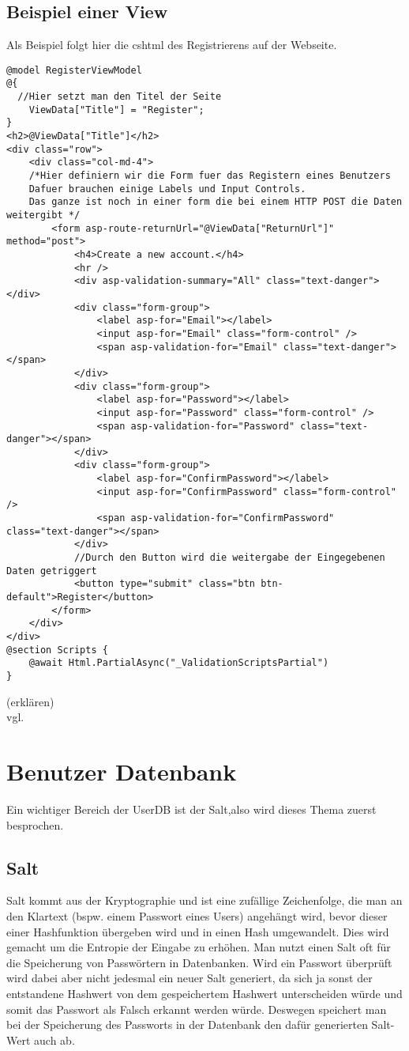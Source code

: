 {\subsection{Beispiel einer View}
\label{mvc_view_beispiel}
Als Beispiel folgt hier die cshtml des Registrierens auf der Webseite.
\begin{lstlisting}
@model RegisterViewModel
@{
  //Hier setzt man den Titel der Seite
    ViewData["Title"] = "Register";
}
<h2>@ViewData["Title"]</h2>
<div class="row">
    <div class="col-md-4">
    /*Hier definiern wir die Form fuer das Registern eines Benutzers
    Dafuer brauchen einige Labels und Input Controls. 
    Das ganze ist noch in einer form die bei einem HTTP POST die Daten weitergibt */
        <form asp-route-returnUrl="@ViewData["ReturnUrl"]" method="post">
            <h4>Create a new account.</h4>
            <hr />
            <div asp-validation-summary="All" class="text-danger"></div>
            <div class="form-group">
                <label asp-for="Email"></label>
                <input asp-for="Email" class="form-control" />
                <span asp-validation-for="Email" class="text-danger"></span>
            </div>
            <div class="form-group">
                <label asp-for="Password"></label>
                <input asp-for="Password" class="form-control" />
                <span asp-validation-for="Password" class="text-danger"></span>
            </div>
            <div class="form-group">
                <label asp-for="ConfirmPassword"></label>
                <input asp-for="ConfirmPassword" class="form-control" />
                <span asp-validation-for="ConfirmPassword" class="text-danger"></span>
            </div>
            //Durch den Button wird die weitergabe der Eingegebenen Daten getriggert
            <button type="submit" class="btn btn-default">Register</button>
        </form>
    </div>
</div>
@section Scripts {
    @await Html.PartialAsync("_ValidationScriptsPartial")
}
\end{lstlisting}
(erklären)
\\ vgl. \textcite{mic_views}
\section{Benutzer Datenbank}
\label{sec:UserDB}
Ein wichtiger Bereich der UserDB ist der Salt,also wird dieses Thema zuerst besprochen.
\subsection{Salt}
\label{sec:salt}
Salt kommt aus der Kryptographie und ist eine zufällige Zeichenfolge, die man an den Klartext (bspw. einem Passwort eines Users) angehängt wird, bevor dieser einer Hashfunktion übergeben wird und in einen Hash umgewandelt. Dies wird gemacht um die Entropie der Eingabe zu erhöhen. Man nutzt einen Salt oft für die Speicherung von Passwörtern in Datenbanken. Wird ein Passwort überprüft wird dabei aber nicht jedesmal ein neuer Salt generiert, da sich ja sonst der entstandene Hashwert von dem gespeichertem Hashwert unterscheiden würde und somit das Passwort als Falsch erkannt werden würde. Deswegen speichert man bei der Speicherung des Passworts in der Datenbank den dafür generierten Salt-Wert auch ab.
}
